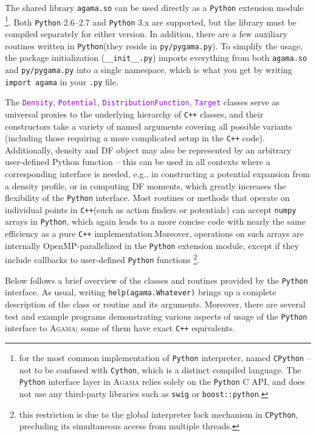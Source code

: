 \documentclass[12pt]{article}
\newcommand{\Agama}{\textsc{Agama}\xspace}
\newcommand{\Cpp}  {\texttt{C++}\xspace}
\newcommand{\Python}{\texttt{Python}\xspace}
\newcommand{\ttt}[1]{\textcolor{darkviolet}{\texttt{#1}}}
\begin{document}
The shared library \texttt{agama.so} can be used directly as a \Python extension module%
\footnote{for the most common implementation of \Python interpreter, named \texttt{CPython} -- not to be confused with \texttt{Cython}, which is a distinct compiled language. The \Python interface layer in \Agama relies solely on the \Python C API, and does not use any third-party libraries such as \texttt{swig} or \texttt{boost::python}.}. Both \Python 2.6--2.7 and \Python 3.x are supported, but the library must be compiled separately for either version. In addition, there are a few auxiliary routines written in \Python (they reside in \texttt{py/pygama.py}). To simplify the usage, the package initialization (\texttt{__init__.py}) imports everything from both \texttt{agama.so} and \texttt{py/pygama.py} into a single namespace, which is what you get by writing \texttt{import agama} in your \texttt{.py} file.

The \ttt{Density}, \ttt{Potential}, \ttt{DistributionFunction}, \ttt{Target} classes serve as universal proxies to the underlying hierarchy of \Cpp classes, and their constructors take a variety of named arguments covering all possible variants (including those requiring a more complicated setup in the \Cpp code).
Additionally, density and DF object may also be represented by an arbitrary user-defined Python function -- this can be used in all contexts where a corresponding interface is needed, e.g., in constructing a potential expansion from a density profile, or in computing DF moments, which greatly increases the flexibility of the \Python interface. Most routines or methods that operate on individual points in \Cpp (such as action finders or potentials) can accept \texttt{numpy} arrays in \Python, which again leads to a more concise code with nearly the same efficiency as a pure \Cpp implementation.Moreover, operations on such arrays are internally OpenMP-parallelized in the \Python extension module, except if they include callbacks to user-defined \Python functions%
\footnote{this restriction is due to the global interpreter lock mechanism in \texttt{CPython}, precluding its simultaneous access from multiple threads.}.

Below follows a brief overview of the classes and routines provided by the \Python interface.
As usual, writing \texttt{help(agama.Whatever)} brings up a complete description of the class or routine and its arguments. Moreover, there are several test and example programs demonstrating various aspects of usage of the \Python interface to \Agama; some of them have exact \Cpp equivalents.
\end{document}
